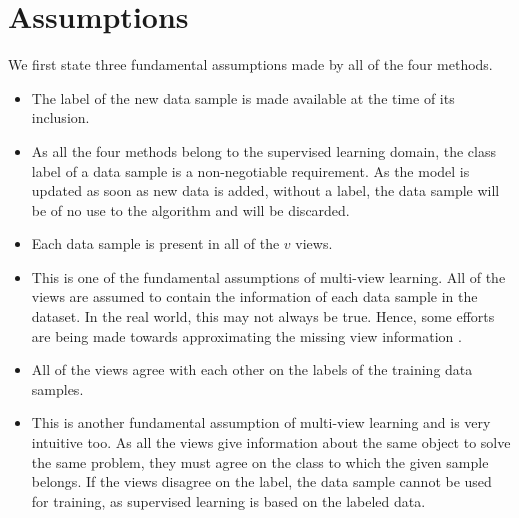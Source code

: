 \section{Assumptions}
\label{sec:Assumptions}
We first state three fundamental assumptions made by all of the four methods.
\begin{itemize}
	\item[A)] The label of the new data sample is made available at the time of its inclusion.
	\item[-] As all the four methods belong to the supervised learning domain, the class label of a data sample is a non-negotiable requirement. As the model is updated as soon as new data is added, without a label, the data sample will be of no use to the algorithm and will be discarded.
	
	\item[B)] Each data sample is present in all of the $v$ views.
	\item[-] This is one of the fundamental assumptions of multi-view learning. All of the views are assumed to contain the information of each data sample in the dataset. In the real world, this may not always be true. Hence, some efforts are being made towards approximating the missing view information \cite{XuTX15, ZhangZZSJ18}.
	
	\item[C)] All of the views agree with each other on the labels of the training data samples.
	\item[-] This is another fundamental assumption of multi-view learning and is very intuitive too. As all the views give information about the same object to solve the same problem, they must agree on the class to which the given sample belongs. If the views disagree on the label, the data sample cannot be used for training, as supervised learning is based on the labeled data.
\end{itemize}

